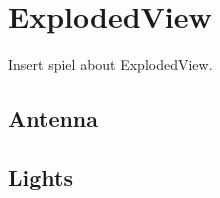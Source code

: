 

\clearpage
\section{ExplodedView}

Insert spiel about ExplodedView.
\clearpage

\subsection{Antenna}
 
\clearpage

\subsection{Lights}
 
\clearpage
